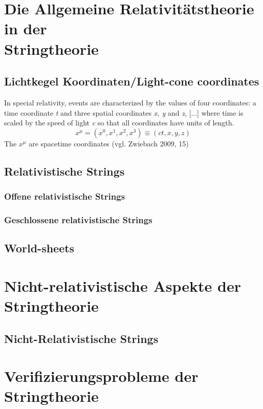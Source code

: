 \documentclass[a4paper, 12pt]{article}
\begin{document}
\section{Die Allgemeine Relativitätstheorie in der \\ Stringtheorie}

\subsection{Lichtkegel Koordinaten/Light-cone coordinates}

In special relativity, events are characterized by the values of four coordinates: a time coordinate \textit{t} and three spatial coordinates \textit{x, y} and \textit{z}, [...] where time is scaled by the speed of light \textit{c} so that all coordinates have units of length. $$ x^ \mu = (x^0,x^1,x^2,x^3) \equiv (ct,x,y,z)$$
The $x^ \mu$ are spacetime coordinates (vgl. Zwiebach 2009, 15)

\subsection{Relativistische Strings}

\subsubsection{Offene relativistische Strings}

\subsubsection{Geschlossene relativistische Strings}

\subsection{World-sheets}

\section{Nicht-relativistische Aspekte der \\ Stringtheorie}

\subsection{Nicht-Relativistische Strings}

\section{Verifizierungsprobleme der Stringtheorie}
\end{document}
